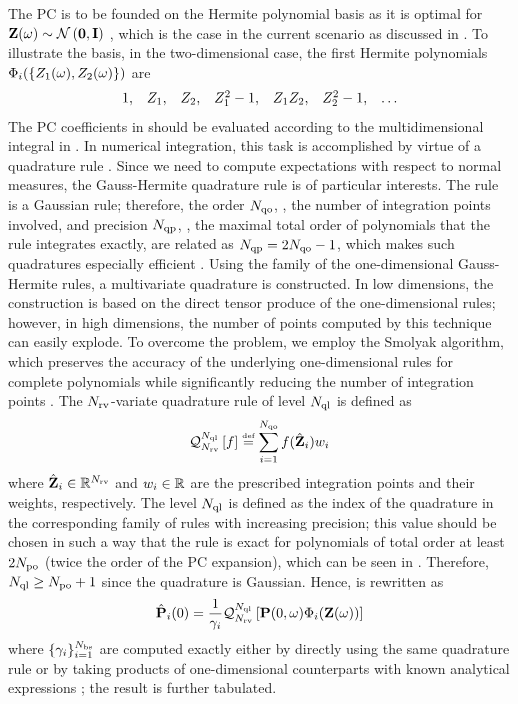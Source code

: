 The PC is to be founded on the Hermite polynomial basis as it is optimal for $\vZ(\o) \sim \normal{\vZero}{\mI}$ \cite{xiu2002}, which is the case in the current scenario as discussed in . To illustrate the basis, in the two-dimensional case, the first Hermite polynomials $\Phi_i(\{ Z_1(\omega), Z_2(\omega) \})$ are
\[
  \begin{array}{lllllll}
  1, & Z_1, & Z_2, & Z_1^2 - 1, & Z_1 Z_2, & Z_2^2 - 1, & \dotsc
  \end{array}
\]
The PC coefficients in  should be evaluated according to the multidimensional integral in . In numerical integration, this task is accomplished by virtue of a quadrature rule \cite{press2007}. Since we need to compute expectations with respect to normal measures, the Gauss-Hermite quadrature rule is of particular interests. The rule is a Gaussian rule; therefore, the order $N_\text{qo}$, \ie, the number of integration points involved, and precision $N_\text{qp}$, \ie, the maximal total order of polynomials that the rule integrates exactly, are related as $N_\text{qp} = 2 N_\text{qo} - 1$, which makes such quadratures especially efficient \cite{heiss2008}. Using the family of the one-dimensional Gauss-Hermite rules, a multivariate quadrature is constructed. In low dimensions, the construction is based on the direct tensor produce of the one-dimensional rules; however, in high dimensions, the number of points computed by this technique can easily explode. To overcome the problem, we employ the Smolyak algorithm, which preserves the accuracy of the underlying one-dimensional rules for complete polynomials while significantly reducing the number of integration points \cite{eldred2009, maitre2010, heiss2008}. The ${N_\text{rv}}$-variate quadrature rule of level $N_\text{ql}$ is defined as
\[
  \oQuad{\vars}{\qdlevel}{f} \eqdef \sum_{i = 1}^{\qdorder} f(\qdn{\vZ}_i) \qdw_i
\]
where $\hat{\mathbf{Z}}_i \in \mathbb{R}^{N_\text{rv}}$ and $w_i \in \mathbb{R}$ are the prescribed integration points and their weights, respectively. The level $N_\text{ql}$ is defined as the index of the quadrature in the corresponding family of rules with increasing precision; this value should be chosen in such a way that the rule is exact for polynomials of total order at least $2 {N_\text{po}}$ (twice the order of the PC expansion), which can be seen in  \cite{eldred2009}. Therefore, $N_\text{ql} \geq {N_\text{po}} + 1$ since the quadrature is Gaussian. Hence,  is rewritten as
\[
  \hat{\mathbf{P}}_i(0) = \frac{1}{\gamma_i} \mathcal{Q}_{{N_\text{rv}}}^{N_\text{ql}}\left[\mathbf{P}(0, \omega) \Phi_i(\mathbf{Z}(\omega))\right]
\]
where $\{ \gamma_i \}_{i = 1}^{{N_\text{bs}}}$ are computed exactly either by directly using the same quadrature rule or by taking products of one-dimensional counterparts with known analytical expressions \cite{xiu2010}; the result is further tabulated.

